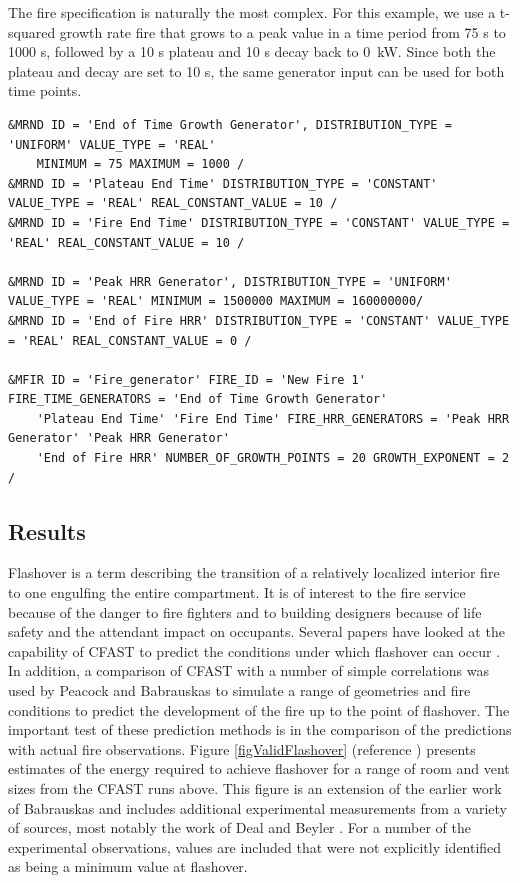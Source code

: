 \documentclass[12pt,twoside]{book}
\begin{document}
The fire specification is naturally the most complex. For this example, we use a t-squared growth rate fire that grows to a peak value in a time period from 75 s to 1000 s, followed by a 10 s plateau and 10 s decay back to 0~kW. Since both the plateau and decay are set to 10 s, the same generator input can be used for both time points.
\vspace{\baselineskip}
\begin{lstlisting}
&MRND ID = 'End of Time Growth Generator', DISTRIBUTION_TYPE = 'UNIFORM' VALUE_TYPE = 'REAL'
    MINIMUM = 75 MAXIMUM = 1000 /
&MRND ID = 'Plateau End Time' DISTRIBUTION_TYPE = 'CONSTANT' VALUE_TYPE = 'REAL' REAL_CONSTANT_VALUE = 10 /
&MRND ID = 'Fire End Time' DISTRIBUTION_TYPE = 'CONSTANT' VALUE_TYPE = 'REAL' REAL_CONSTANT_VALUE = 10 /

&MRND ID = 'Peak HRR Generator', DISTRIBUTION_TYPE = 'UNIFORM' VALUE_TYPE = 'REAL' MINIMUM = 1500000 MAXIMUM = 160000000/
&MRND ID = 'End of Fire HRR' DISTRIBUTION_TYPE = 'CONSTANT' VALUE_TYPE = 'REAL' REAL_CONSTANT_VALUE = 0 /

&MFIR ID = 'Fire_generator' FIRE_ID = 'New Fire 1' FIRE_TIME_GENERATORS = 'End of Time Growth Generator'
    'Plateau End Time' 'Fire End Time' FIRE_HRR_GENERATORS = 'Peak HRR Generator' 'Peak HRR Generator'
    'End of Fire HRR' NUMBER_OF_GROWTH_POINTS = 20 GROWTH_EXPONENT = 2 /
\end{lstlisting}

\subsection{Results}

Flashover is a term describing the transition of a relatively localized interior fire to one engulfing the entire compartment. It is of interest to the fire service because of the danger to fire fighters and to building designers because of life safety and the attendant impact on occupants. Several papers have looked at the capability of CFAST to predict the conditions under which flashover can occur \cite{Valid:Chow_Flashover, Valid:Luo_Flashover, Valid:Collier, Valid:White}. In addition, a comparison of CFAST with a number of simple correlations was used by Peacock and Babrauskas \cite{Valid:Peacock_Flashover_1,Valid:Peacock_Flashover_2} to simulate a range of geometries and fire conditions to predict the development of the fire up to the point of flashover. The important test of  these prediction methods is in the comparison of the predictions with actual fire observations. Figure \ref{figValidFlashover} (reference \cite{Valid:Peacock_Flashover_2}) presents estimates of the energy required to achieve flashover for a range of room and vent sizes from the CFAST runs above. This figure is an extension of the earlier work of Babrauskas  \cite{Valid:Babrauskas_Flashover} and includes additional experimental measurements from a variety of sources, most notably the work of Deal and Beyler \cite{Valid:DealandBeyler}. For a number of the experimental observations, values are included that were not explicitly identified as being a minimum value at flashover.
\end{document}
